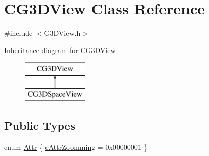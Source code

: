 \hypertarget{class_c_g3_d_view}{}\section{C\+G3\+D\+View Class Reference}
\label{class_c_g3_d_view}


{\ttfamily \#include $<$G3\+D\+View.\+h$>$}

Inheritance diagram for C\+G3\+D\+View\+:\begin{figure}[H]
\begin{center}
\leavevmode
\includegraphics[height=2.000000cm]{class_c_g3_d_view}
\end{center}
\end{figure}
\subsection*{Public Types}
\begin{DoxyCompactItemize}
\item 
enum \hyperlink{class_c_g3_d_view_ae3a6556009bb00e43baf4d7087921475}{Attr} \{ \hyperlink{class_c_g3_d_view_ae3a6556009bb00e43baf4d7087921475a9ab10c0b993d57d6af9825fb53949112}{e\+Attr\+Zoomming} = 0x00000001
 \}
\end{DoxyCompactItemize}
